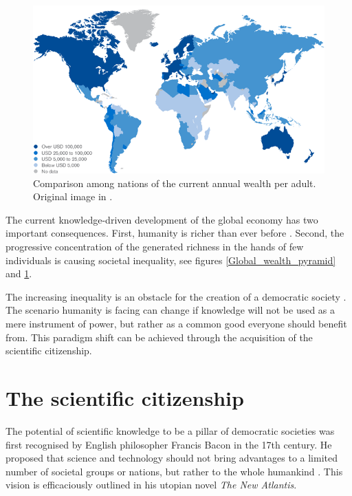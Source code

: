 \begin{figure}[!t] 
 \begin{center}
 \includegraphics[scale=0.3]{Images/World_wealth_levels.png}
 \caption{Comparison among nations of the current annual wealth per adult. Original image in \cite{Kersley}.}
 \label{World_wealth_levels}
 \end{center}
\end{figure}

The current knowledge-driven development of the global economy has two important consequences. First, humanity is richer than ever before \cite{Maddison}. Second, the progressive concentration of the generated richness in the hands of few individuals is causing societal inequality, see figures \ref{Global_wealth_pyramid} and \ref{World_wealth_levels}. 

The increasing inequality is an obstacle for the creation of a democratic society \cite{Mckenna}. The scenario humanity is facing can change if knowledge will not be used as a mere instrument of power, but rather as a common good everyone should benefit from. This paradigm shift can be achieved through the acquisition of the scientific citizenship.

\section{The scientific citizenship} \label{The_scientific_citizenship}
The potential of scientific knowledge to be a pillar of democratic societies was first recognised by English philosopher Francis Bacon in the 17th century. He proposed that science and technology should not bring advantages to a limited number of societal groups or nations, but rather to the whole humankind \cite{Zagorin}. This vision is efficaciously outlined in his utopian novel \textit{The New Atlantis}.

